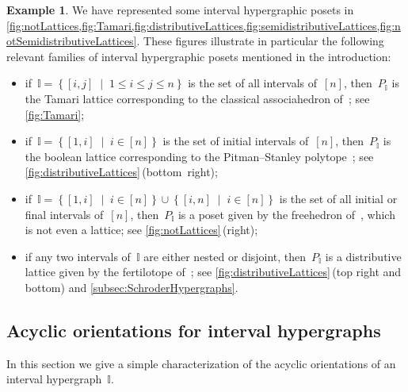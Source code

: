 \documentclass[reqno]{amsart}
\theoremstyle{definition}
\newtheorem{example}[theorem]{Example}
\newcommand{\set}[2]{\left\{ #1 \;\middle|\; #2 \right\}} %
\newcommand{\II}{\mathbb I} %
\begin{document}
\begin{example}
We have represented some interval hypergraphic posets in \cref{fig:notLattices,fig:Tamari,fig:distributiveLattices,fig:semidistributiveLattices,fig:notSemidistributiveLattices}.
These figures illustrate in particular the following relevant families of interval hypergraphic posets mentioned in the introduction:
\begin{itemize}
\item if~$\II = \set{[i,j]}{1 \le i \le j \le n}$ is the set of all intervals of~$[n]$, then~$P_\II$ is the Tamari lattice corresponding to the classical associahedron of~\cite{ShniderSternberg,Loday}; see \cref{fig:Tamari};
\item if~$\II = \set{[1,i]}{i \in [n]}$ is the set of initial intervals of~$[n]$, then~$P_\II$ is the boolean lattice corresponding to the Pitman--Stanley polytope~\cite{PitmanStanley}; see \cref{fig:distributiveLattices}\,(bottom~right);
\item if~$\II = \set{[1,i]}{i \in [n]} \cup \set{[i,n]}{i \in [n]}$ is the set of all initial or final intervals of~$[n]$, then~$P_\II$ is a poset given by the freehedron of~\cite{Saneblidze-freehedron}, which is not even a lattice; see \cref{fig:notLattices}\,(right);
\item if any two intervals of~$\II$ are either nested or disjoint, then~$P_\II$ is a distributive lattice given by the fertilotope of~\cite{Defant-fertilitopes}; see \cref{fig:distributiveLattices}\,(top right and bottom) and \cref{subsec:SchroderHypergraphs}.
\end{itemize}
\end{example}


\subsection{Acyclic orientations for interval hypergraphs}
\label{subsec:acyclicI}

In this section we give a simple characterization of the acyclic orientations of an interval hypergraph~$\II$.
\end{document}
